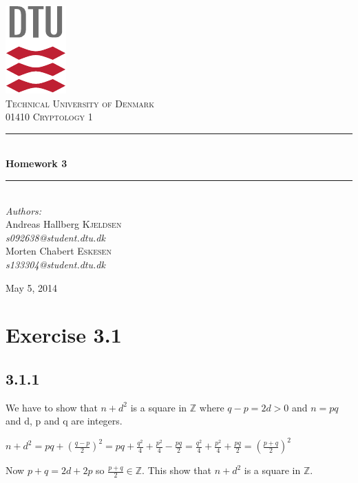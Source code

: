 \documentclass[11pt]{report}
\newcommand{\HRule}{\rule{\linewidth}{0.5mm}}
\begin{document}
\begin{titlepage}
\begin{center}

\includegraphics[scale=2.0]{../GFX/dtu_logo.pdf}\\[1cm]
\textsc{\LARGE Technical University of Denmark}\\[1.5cm]
\textsc{\Large 01410 Cryptology 1}\\[0.5cm]

\HRule \\[0.4cm]
{\huge \bfseries Homework 3}\\[0.1cm]
\HRule \\[1.5cm]

{\large
\emph{Authors:} \\[10pt]
Andreas Hallberg \textsc{Kjeldsen}\\
\emph{s092638@student.dtu.dk} \\[10pt]
Morten Chabert \textsc{Eskesen}\\
\emph{s133304@student.dtu.dk}
}
\vfill

{\large May 5, 2014}

\end{center}
\end{titlepage}

\section*{Exercise 3.1}
\subsection*{3.1.1}
We have to show that $n + d^2$ is a square in $\mathbb{Z}$ where $q - p = 2d > 0$ and $n = pq$ and d, p and q are integers.
\begin{center}
$n + d^2 = pq + (\frac{q-p}{2})^2 = pq + \frac{q^2}{4} + \frac{p^2}{4} - \frac{pq}{2} = \frac{q^2}{4} + \frac{p^2}{4}+\frac{pq}{2} = (\frac{p+q}{2})^2$
\end{center}
Now $p + q = 2d + 2p$ so $\frac{p+q}{2} \in \mathbb{Z}$. This show that $n + d^2$ is a square in $\mathbb{Z}$.
\end{document}
